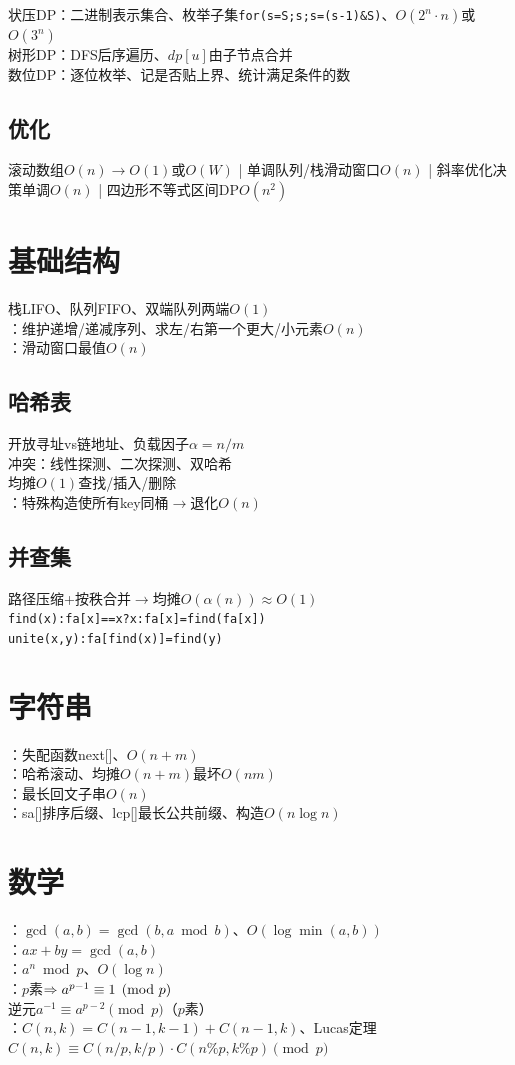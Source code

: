 \documentclass[lang=zh,cols=5,paper=a4,fontsize=6pt,scheme=classic]{../cheatsheet}
\begin{document}
状压DP：二进制表示集合、枚举子集\texttt{for(s=S;s;s=(s-1)\&S)}、$O(2^n\cdot n)$或$O(3^n)$\\
树形DP：DFS后序遍历、$dp[u]$由子节点合并\\
数位DP：逐位枚举、记是否贴上界、统计满足条件的数

\subsection{优化}
滚动数组$O(n)\to O(1)$或$O(W)$ | 单调队列/栈滑动窗口$O(n)$ | 斜率优化决策单调$O(n)$ | 四边形不等式区间DP$O(n^2)$

\section{基础结构}
栈LIFO、队列FIFO、双端队列两端$O(1)$\\
：维护递增/递减序列、求左/右第一个更大/小元素$O(n)$\\
：滑动窗口最值$O(n)$

\subsection{哈希表}
开放寻址vs链地址、负载因子$\alpha=n/m$\\
冲突：线性探测、二次探测、双哈希\\
均摊$O(1)$查找/插入/删除\\
：特殊构造使所有key同桶$\to$退化$O(n)$

\subsection{并查集}
路径压缩+按秩合并$\to$均摊$O(\alpha(n))\approx O(1)$\\
\texttt{find(x):fa[x]==x?x:fa[x]=find(fa[x])}\\
\texttt{unite(x,y):fa[find(x)]=find(y)}

\section{字符串}
：失配函数next[]、$O(n+m)$\\
：哈希滚动、均摊$O(n+m)$最坏$O(nm)$\\
：最长回文子串$O(n)$\\
：sa[]排序后缀、lcp[]最长公共前缀、构造$O(n\log n)$

\section{数学}
：$\gcd(a,b)=\gcd(b,a\bmod b)$、$O(\log\min(a,b))$\\
：$ax+by=\gcd(a,b)$\\
：$a^n\bmod p$、$O(\log n)$\\
：$p$素$\Rightarrow a^{p-1}\equiv1\pmod{p}$\\
逆元$a^{-1}\equiv a^{p-2}\pmod{p}$（$p$素）\\
：$C(n,k)=C(n-1,k-1)+C(n-1,k)$、Lucas定理$C(n,k)\equiv C(n/p,k/p)\cdot C(n\%p,k\%p)\pmod{p}$

\stopcols
\end{document}
